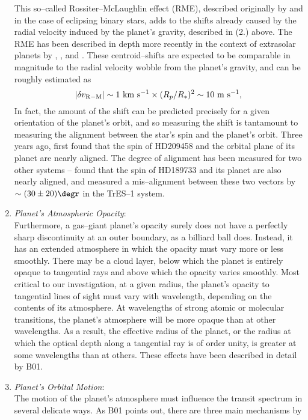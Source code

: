 \documentclass[12pt,preprint]{aastex}
\begin{document}
\begin{enumerate}
This so--called Rossiter--McLaughlin effect (RME), described originally by
\citet{rossiter1924} and \citet{mclaughlin1924} in the case of eclipsing binary
stars, adds to the shifts already caused by the radial velocity induced by
the planet's gravity, described in (2.) above.  The RME has been described in
depth more recently in the context of extrasolar planets by
\citet{ohta_et_al2005}, \citet{gimenez_et_al2006}, and \citet{gaudi+winn2007}.
These centroid--shifts are expected to be comparable in magnitude to the radial
velocity wobble from the planet's gravity, and can be roughly estimated as
\[
\left| \delta v_{\rm R-M} \right| \sim 1 {\rm ~km~s^{-1}} \times (R_p/R_*)^2 \sim 10 {\rm ~m~s^{-1}},
\]
In fact, the amount of the shift can be predicted precisely for a given
orientation of the planet's orbit, and so measuring the shift is
tantamount to measuring the alignment between the star's spin and the planet's
orbit.  Three years ago, \citet{winn_et_al2005} first found that the spin of
HD209458 and the orbital plane of its planet are nearly aligned.  The degree
of alignment has been measured for two other systems -- \citet{winn_et_al2006}
found that the spin of HD189733 and its planet are also nearly aligned,
and \citet{narita_et_al2007} measured a mis--alignment between these two
vectors by $\sim (30 \pm 20)\degr$ in the TrES--1 system. 
\item {\it Planet's Atmospheric Opacity}:\\
 Furthermore, a gas--giant planet's opacity surely does not have a
perfectly sharp discontinuity at an outer boundary, as a billiard ball does.
Instead, it has an extended atmosphere in which the opacity must vary more or
less smoothly.  There may be a cloud layer, below which the planet is
entirely opaque to tangential rays and above which the opacity varies smoothly.
Most critical to our investigation, at a given radius, the planet's opacity
to tangential lines of sight must vary with wavelength, depending on the
contents of its atmosphere.  At wavelengths of strong atomic or molecular
transitions, the planet's atmosphere will be more opaque than at other
wavelengths.  As a result, the effective radius of the planet, or the
radius at which the optical depth along a tangential ray is of order unity,
is greater at some wavelengths than at others.  These effects have been
described in detail by B01.
\item {\it Planet's Orbital Motion}:\\
 The motion of the planet's atmosphere must influence the transit spectrum in
several delicate ways.  As B01 points out, there are three main mechanisms by

\end{enumerate}
\end{document}
